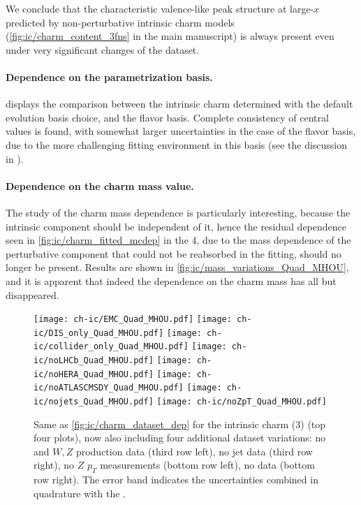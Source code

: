 We conclude that the characteristic valence-like peak structure at large-$x$
predicted by non-perturbative intrinsic charm models
(\cref{fig:ic/charm_content_3fns} in the main manuscript) is always present
even under very significant changes of the dataset.

\paragraph{Dependence on the parametrization basis.}
%
 displays the comparison between the intrinsic
charm \pdf determined with the default evolution basis choice, and the flavor
basis. Complete consistency of central values is found, with somewhat larger
uncertainties in the case of the flavor basis, due to the more  challenging
fitting environment in this basis (see the discussion in \cite{Ball:2021leu}).

\paragraph{Dependence on the charm mass value.}
%
The study of the charm mass dependence is particularly interesting, because the
intrinsic component should be independent of it, hence the residual dependence
seen in \cref{fig:ic/charm_fitted_mcdep} in the 4\fns, due to the mass
dependence of the perturbative component that could not be reabsorbed in the
fitting, should no longer be present. 
Results are shown in \cref{fig:ic/mass_variations_Quad_MHOU}, and it is
apparent that indeed the dependence on the charm mass has all but disappeared.

\begin{figure}[H]
  \centering
  \texttt{[image: ch-ic/EMC\_Quad\_MHOU.pdf]}
  \texttt{[image: ch-ic/DIS\_only\_Quad\_MHOU.pdf]}
  \texttt{[image: ch-ic/collider\_only\_Quad\_MHOU.pdf]}
  \texttt{[image: ch-ic/noLHCb\_Quad\_MHOU.pdf]}
  \texttt{[image: ch-ic/noHERA\_Quad\_MHOU.pdf]}
  \texttt{[image: ch-ic/noATLASCMSDY\_Quad\_MHOU.pdf]}
  \texttt{[image: ch-ic/nojets\_Quad\_MHOU.pdf]}
  \texttt{[image: ch-ic/noZpT\_Quad\_MHOU.pdf]}
  \caption{\small
    Same as \cref{fig:ic/charm_dataset_dep} for the intrinsic charm (3\fns)
    \pdf (top four plots), now also including four additional dataset
    variations:  no \atlas and \cms $W, Z$ production data   (third row left),
    no jet data (third row right), no $Z$ $p_T$ measurements (bottom row left),
    no \hera \dis data (bottom row right). 
    The error band indicates the \pdf uncertainties combined in quadrature with
    the .
  }
  \label{fig:ic/charm_dataset_dep_nf3}
\end{figure}



